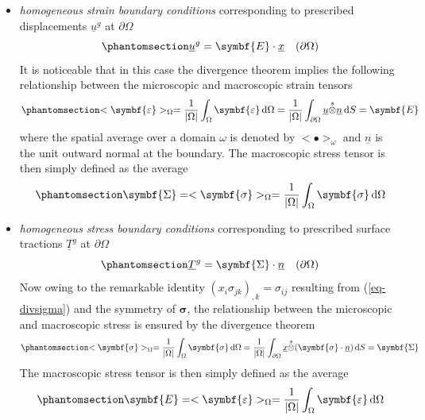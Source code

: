 \documentclass[
  a4paper,
  numbers=noendperiod,
  DIV=12]{scrreprt}
\newcommand{\uu}[1]{{\symbf{{#1}}}}
\newcommand{\uv}[1]{{\underline{{#1}}}}
\newcommand{\x}{{\uv{{x}}}}
\newcommand{\n}{{\uv{{n}}}}
\newcommand{\eps}{{\uu{{\varepsilon}}}}
\newcommand{\E}{{\uu{{E}}}}
\newcommand{\sig}{{\uu{{\sigma}}}}
\newcommand{\Sig}{{\uu{{\Sigma}}}}
\newcommand{\sotimes}{{\stackrel{s}{\otimes}}}
\newcommand{\ud}{{\,\mathrm{d}}}
\begin{document}
\begin{itemize}
\item
  \emph{homogeneous strain boundary conditions} corresponding to
  prescribed displacements \(\uv{u}^g\) at \(\partial\Omega\)
  \begin{equation}\phantomsection\label{eq-homstrainBC}{
  \uv{u}^g=\E\cdot\x \quad(\partial\Omega)
  }\end{equation} It is noticeable that in this case the divergence
  theorem implies the following relationship between the microscopic and
  macroscopic strain tensors
  \begin{equation}\phantomsection\label{eq-EhomstrainBC}{
  <\eps>_{\Omega}=\frac{1}{\lvert \Omega \rvert}\int_\Omega \eps\ud \Omega
  =\frac{1}{\lvert \Omega \rvert}\int_{\partial\Omega} \uv{u}\sotimes\n \ud S
  =\E
  }\end{equation} where the spatial average over a domain \(\omega\) is
  denoted by \(<\bullet>_\omega\) and \(\n\) is the unit outward normal
  at the boundary. The macroscopic stress tensor is then simply defined
  as the average \begin{equation}\phantomsection\label{eq-ShomstrainBC}{
  \Sig=
  <\sig>_{\Omega}=\frac{1}{\lvert \Omega \rvert}\int_\Omega \sig\ud \Omega
  }\end{equation}
\item
  \emph{homogeneous stress boundary conditions} corresponding to
  prescribed surface tractions \(\uv{T}^g\) at \(\partial\Omega\)
  \begin{equation}\phantomsection\label{eq-homstressBC}{
  \uv{T}^g=\Sig\cdot\n \quad(\partial\Omega)
  }\end{equation} Now owing to the remarkable identity
  \((x_i\sigma_{jk})_{,k}=\sigma_{ij}\) resulting from
  (\ref{eq-divsigma}) and the symmetry of \(\sig\), the relationship
  between the microscopic and macroscopic stress is ensured by the
  divergence theorem
  \begin{equation}\phantomsection\label{eq-ShomstressBC}{
  <\sig>_{\Omega}=\frac{1}{\lvert \Omega \rvert}\int_\Omega \sig\ud \Omega
  =\frac{1}{\lvert \Omega \rvert}\int_{\partial\Omega} \x\sotimes(\sig\cdot\n) \ud S
  =\Sig
  }\end{equation} The macroscopic stress tensor is then simply defined
  as the average \begin{equation}\phantomsection\label{eq-EhomstressBC}{
  \E=
  <\eps>_{\Omega}=\frac{1}{\lvert \Omega \rvert}\int_\Omega \eps\ud \Omega
  }\end{equation}
\end{itemize}
\end{document}
